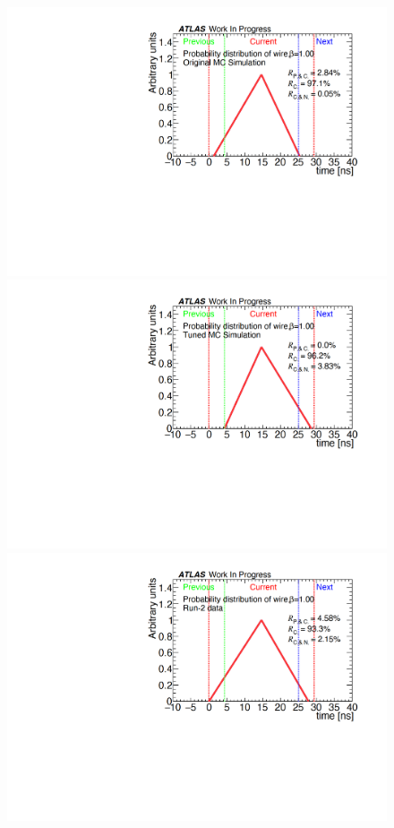 \begin{figure}[H]
    \begin{minipage}{0.33\hsize}
    \centering   
    \includegraphics[width=\textwidth,page=1]{img/rec/rec_ori_w.pdf}
    \subcaption{}
    \end{minipage}
    \begin{minipage}{0.33\hsize}
    \centering   
    \includegraphics[width=\textwidth,page=1]{img/rec/rec_tune_w.pdf}
    \subcaption{}
    \end{minipage}
    \begin{minipage}{0.33\hsize}
    \centering   
    \includegraphics[width=\textwidth,page=1]{img/rec/rec_data_w.pdf}

\end{minipage}
\end{figure}
